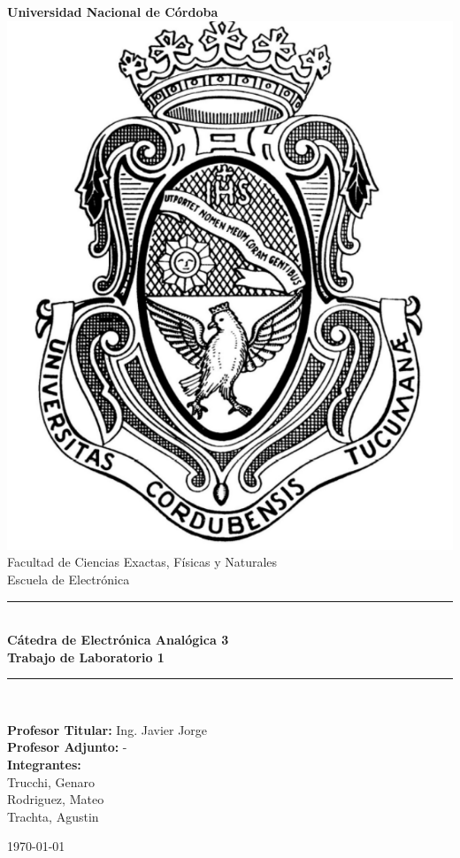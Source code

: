 \documentclass[a4paper,12pt]{article}
\begin{document}
\begin{titlepage}
    \begin{center}
        {\LARGE \textbf{Universidad Nacional de Córdoba}}\\[1.5cm]

        \includegraphics[scale=0.4]{img/logo2.png}\\[1.5cm]

        {\large Facultad de Ciencias Exactas, Físicas y Naturales}\\
        {\large Escuela de Electrónica}\\[1cm]

        \rule{\linewidth}{0.5mm}\\[0.4cm]
        {\Large \textbf{Cátedra de Electrónica Analógica 3}}\\[0.3cm]
        {\LARGE \textbf{Trabajo de Laboratorio 1}}\\[0.3cm]
        \rule{\linewidth}{0.5mm}\\[1cm]

        \begin{flushleft}
        {\large 
            \textbf{Profesor Titular:} Ing. Javier Jorge\\
            \textbf{Profesor Adjunto:} -\\[0.5cm]
            \textbf{Integrantes:}\\
            Trucchi, Genaro\\
            Rodriguez, Mateo\\
            Trachta, Agustin\\
        }
        \end{flushleft}

        \vfill

        {\large \today}
    \end{center}
\end{titlepage}
\end{document}
